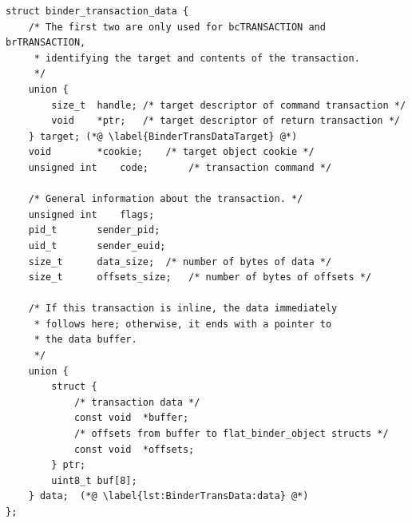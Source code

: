 \documentclass[a4paper,11pt]{article}
\begin{document}
\begin{lstlisting}[label=BinderTransactionData,]
struct binder_transaction_data {
	/* The first two are only used for bcTRANSACTION and brTRANSACTION,
	 * identifying the target and contents of the transaction.
	 */
	union {
		size_t	handle;	/* target descriptor of command transaction */
		void	*ptr;	/* target descriptor of return transaction */
	} target; (*@ \label{BinderTransDataTarget} @*)
	void		*cookie;	/* target object cookie */
	unsigned int	code;		/* transaction command */

	/* General information about the transaction. */
	unsigned int	flags;
	pid_t		sender_pid;
	uid_t		sender_euid;
	size_t		data_size;	/* number of bytes of data */
	size_t		offsets_size;	/* number of bytes of offsets */

	/* If this transaction is inline, the data immediately
	 * follows here; otherwise, it ends with a pointer to
	 * the data buffer.
	 */
	union {
		struct {
			/* transaction data */
			const void	*buffer;
			/* offsets from buffer to flat_binder_object structs */
			const void	*offsets;
		} ptr;
		uint8_t	buf[8];
	} data;  (*@ \label{lst:BinderTransData:data} @*)
};
\end{lstlisting}
\end{document}
